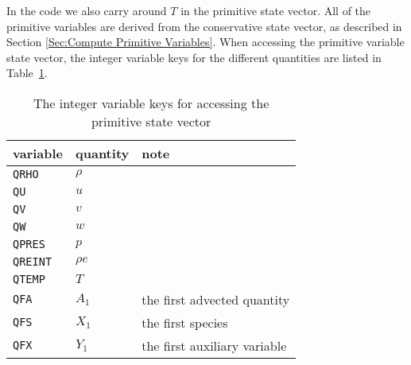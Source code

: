In the code we also carry around $T$ in the primitive state vector.
All of the primitive variables are derived from the conservative state
vector, as described in Section \ref{Sec:Compute Primitive Variables}.
When accessing the primitive variable state vector, the integer variable
keys for the different quantities are listed in Table~\ref{table:primlist}.

\begin{table}[t]
  \centering
\begin{tabular}{llp{3.5in}}
  \hline
      {\bf variable} & {\bf quantity} & {\bf note} \\
  \hline
{\tt  QRHO} & $\rho$ \\
{\tt  QU} & $u$ \\
{\tt  QV} & $v$ \\
{\tt  QW} & $w$ \\
{\tt  QPRES} & $p$ \\
{\tt  QREINT} & $\rho e$ \\
{\tt  QTEMP} & $T$ \\
{\tt  QFA} & $A_1$ & the first advected quantity \\
{\tt  QFS} & $X_1$ & the first species \\
{\tt  QFX} & $Y_1$ & the first auxiliary variable \\
 \hline
\end{tabular}
\caption{\label{table:primlist} The integer variable keys for accessing the
  primitive state vector}
\end{table}

